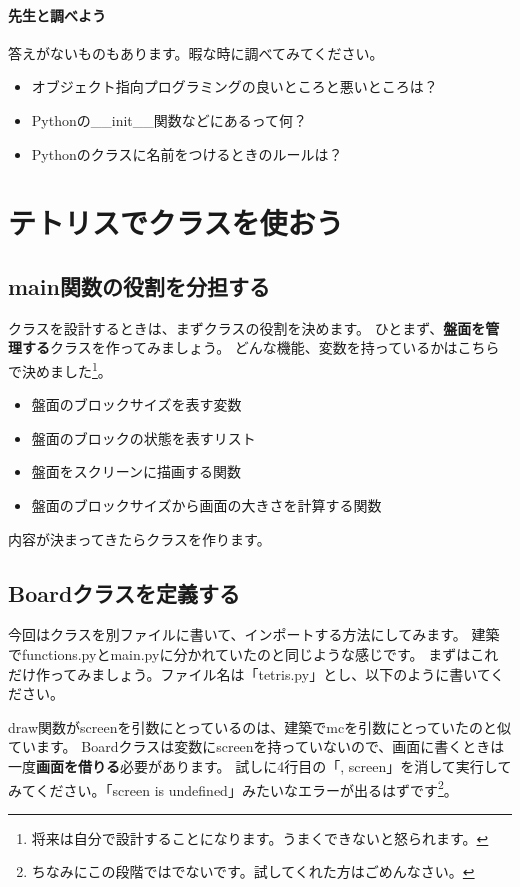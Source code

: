 \documentclass[12pt, a4paper, dvipdfmx]{book}
\begin{document}
\subsubsection{先生と調べよう}
答えがないものもあります。暇な時に調べてみてください。
\begin{itemize}
  \item オブジェクト指向プログラミングの良いところと悪いところは？
  \item Pythonの\_\_init\_\_関数などにあるって何？
  \item Pythonのクラスに名前をつけるときのルールは？
\end{itemize}

\chapter{テトリスでクラスを使おう}
\section{main関数の役割を分担する}
クラスを設計するときは、まずクラスの役割を決めます。
ひとまず、\textbf{盤面を管理する}クラスを作ってみましょう。
どんな機能、変数を持っているかはこちらで決めました\footnote{将来は自分で設計することになります。うまくできないと怒られます。}。
\begin{itemize}
  \item 盤面のブロックサイズを表す変数
  \item 盤面のブロックの状態を表すリスト
  \item 盤面をスクリーンに描画する関数
  \item 盤面のブロックサイズから画面の大きさを計算する関数
\end{itemize}
内容が決まってきたらクラスを作ります。
\section{Boardクラスを定義する}
今回はクラスを別ファイルに書いて、インポートする方法にしてみます。
建築でfunctions.pyとmain.pyに分かれていたのと同じような感じです。
まずはこれだけ作ってみましょう。ファイル名は「tetris.py」とし、以下のように書いてください。

draw関数がscreenを引数にとっているのは、建築でmcを引数にとっていたのと似ています。
Boardクラスは変数にscreenを持っていないので、画面に書くときは一度\textbf{画面を借りる}必要があります。
試しに4行目の「, screen」を消して実行してみてください。「screen is undefined」みたいなエラーが出るはずです\footnote{ちなみにこの段階ではでないです。試してくれた方はごめんなさい。}。
\end{document}
